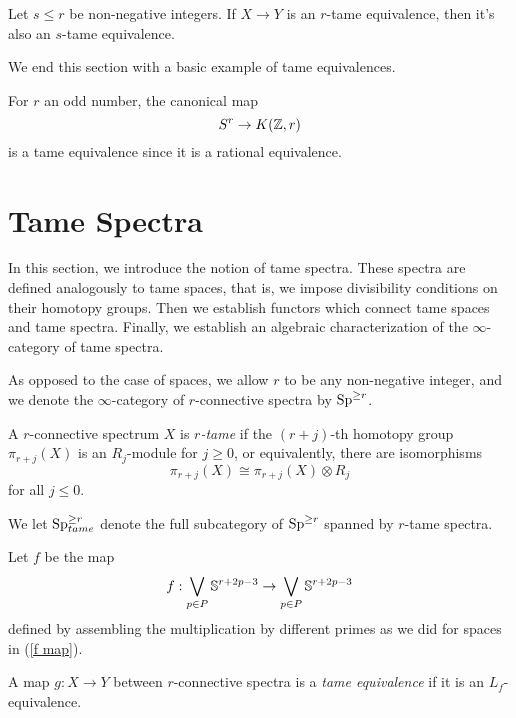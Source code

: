 \begin{remark}
	Let $s\leq r$ be non-negative integers.
	If $X\to Y$ is an $r$-tame equivalence, then it's also an $s$-tame equivalence.
\end{remark}

We end this section with a basic example of tame equivalences.
\begin{example}
\label{odd sphere is tame equivalent to EM-space}
For $r$ an odd number,
the canonical map 
$$
S^r \to K({\mathbb{Z}}, r)
$$
is a tame equivalence since it is a rational equivalence.
\end{example}

\section{Tame Spectra}
\label{Section: Tame spectra}

In this section, we introduce the notion of tame spectra.
These spectra are defined analogously to tame spaces, that is, we impose divisibility conditions on their homotopy groups.
Then we establish functors which connect tame spaces and tame spectra.
Finally, we establish an algebraic characterization of the $\infty$-category of tame spectra.

As opposed to the case of spaces, we allow $r$ to be any non-negative integer, and we denote the $\infty$-category of $r$-connective spectra by $\operatorname{Sp}^{\geq r}$.

\begin{definition}
	A $r$-connective spectrum $X$ is \emph{$r$-tame} if the $(r+j)$-th homotopy group $\pi_{r+j}(X)$ is an $R_j$-module for $j\geq 0$, or equivalently, there are isomorphisms
	\[
	\pi_{r+j}(X)\cong \pi_{r+j}(X)\otimes R_{j}
	\]
	for all $j\leq 0$.
\end{definition}

\begin{notation}
We let $\operatorname{Sp}^{\geq r}_{tame}$ denote the full subcategory of $\operatorname{Sp}^{\geq r}$ spanned by $r$-tame spectra.
\end{notation}


Let $f$ be the map 
\begin{equation}
\label{f for spectra}
	f: \bigvee_{p\in P}{\mathbb{S}}^{r+2p-3} \to \bigvee_{p\in P}{\mathbb{S}}^{r+2p-3}
\end{equation}
defined by assembling the multiplication by different primes as we did for spaces in (\ref{f map}).
\begin{definition}
    A map $g:X \to Y$ between $r$-connective spectra is a \emph{tame equivalence} if it is an $L_f$-equivalence.
\end{definition}

